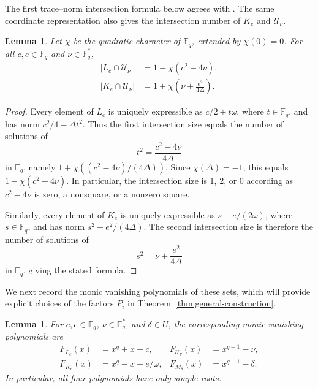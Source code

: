 \documentclass[preprint,12pt,a4paper]{elsarticle}
\newtheorem{lemma}[theorem]{Lemma}
\begin{document}
The first trace--norm intersection formula below agrees with \cite[Lemma~8]{FangWenFu2024}. The same coordinate representation also gives the intersection number of $K_e$ and $\mathcal U_\nu$.

\begin{lemma}\label{lem:trace-norm-intersections}
Let $\chi$ be the quadratic character of $\mathbb F_q$, extended by $\chi(0)=0$. For all $c,e\in\mathbb F_q$ and $\nu\in\mathbb F_q^{*}$,
\[
\begin{aligned}
 |L_c\cap\mathcal U_\nu|&=1-\chi(c^2-4\nu),\\
 |K_e\cap\mathcal U_\nu|&=1+\chi\left(\nu+\frac{e^2}{4\Delta}\right).
\end{aligned}
\]
\end{lemma}

\begin{proof}
Every element of $L_c$ is uniquely expressible as $c/2+t\omega$, where $t\in\mathbb F_q$, and has norm $c^2/4-\Delta t^2$. Thus the first intersection size equals the number of solutions of
\[
 t^2=\frac{c^2-4\nu}{4\Delta}
\]
in $\mathbb F_q$, namely $1+\chi((c^2-4\nu)/(4\Delta))$. Since $\chi(\Delta)=-1$, this equals $1-\chi(c^2-4\nu)$. In particular, the intersection size is 1, 2, or 0 according as $c^2-4\nu$ is zero, a nonsquare, or a nonzero square.

Similarly, every element of $K_e$ is uniquely expressible as $s-e/(2\omega)$, where $s\in\mathbb F_q$, and has norm $s^2-e^2/(4\Delta)$. The second intersection size is therefore the number of solutions of
\[
s^2=\nu+\frac{e^2}{4\Delta}\]
in $\mathbb F_q$, giving the stated formula.
\end{proof}

We next record the monic vanishing polynomials of these sets, which will provide explicit choices of the factors $P_i$ in Theorem~\ref{thm:general-construction}.

\begin{lemma}\label{lem:basic-vanishing-polynomials}
For $c,e\in\mathbb F_q$, $\nu\in\mathbb F_q^{*}$, and $\delta\in U$, the corresponding monic vanishing polynomials are
\begin{equation}\label{eq:basic-vanishing-polynomials}
\begin{aligned}
 F_{L_c}(x)&=x^q+x-c,&
 F_{\mathcal U_\nu}(x)&=x^{q+1}-\nu,\\
 F_{K_e}(x)&=x^q-x-e/\omega,&
 F_{M_\delta}(x)&=x^{q-1}-\delta.
\end{aligned}
\end{equation}
In particular, all four polynomials have only simple roots.
\end{lemma}
\end{document}

